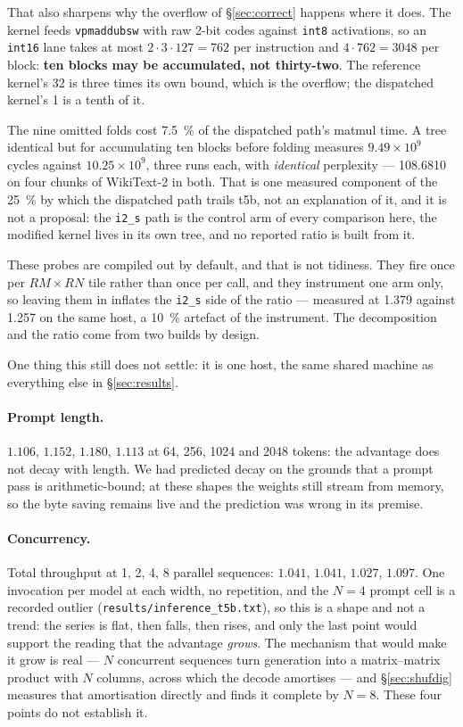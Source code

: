 \documentclass[11pt,a4paper]{article}
\newcommand{\code}[1]{\texttt{#1}}
\begin{document}
That also sharpens why the overflow of
\S\ref{sec:correct} happens where it does. The kernel feeds
\code{vpmaddubsw} with raw 2-bit codes against \code{int8} activations, so an
\code{int16} lane takes at most $2 \cdot 3 \cdot 127 = 762$ per instruction and
$4 \cdot 762 = 3048$ per block: \textbf{ten blocks may be accumulated, not
thirty-two}. The reference kernel's 32 is three times its own bound, which is
the overflow; the dispatched kernel's 1 is a tenth of it.

The nine omitted folds cost \SI{7.5}{\percent} of the dispatched path's
matmul time. A tree identical but for accumulating ten blocks before folding
measures $9.49 \times 10^{9}$ cycles against $10.25 \times 10^{9}$, three runs
each, with \emph{identical} perplexity --- \num{108.6810} on four chunks of
WikiText-2 in both. That is one measured component of the \SI{25}{\percent} by
which the dispatched path trails t5b, not an explanation of it, and it is not a
proposal: the \code{i2\_s} path is the control arm of every comparison here, the
modified kernel lives in its own tree, and no reported ratio is built from it.

These probes are compiled out by default, and that is not tidiness. They fire
once per $\mathit{RM} \times \mathit{RN}$ tile rather than once per call, and
they instrument one arm only, so leaving them in inflates the \code{i2\_s} side
of the ratio --- measured at \num{1.379} against \num{1.257} on the same host, a
\SI{10}{\percent} artefact of the instrument. The decomposition and the ratio
come from two builds by design.

One thing this still does not settle: it is one host, the same shared machine as
everything else in \S\ref{sec:results}.

\paragraph{Prompt length.} $1.106$, $1.152$, $1.180$, $1.113$ at 64, 256, 1024
and 2048 tokens: the advantage does not decay with length. We had predicted
decay on the grounds that a prompt pass is arithmetic-bound; at these shapes the
weights still stream from memory, so the byte saving remains live and the
prediction was wrong in its premise.

\paragraph{Concurrency.} Total throughput at 1, 2, 4, 8 parallel sequences:
$1.041$, $1.041$, $1.027$, $1.097$. One invocation per model at each width, no
repetition, and the $N=4$ prompt cell is a recorded outlier
(\code{results/inference\_t5b.txt}), so this is a shape and not a trend: the
series is flat, then falls, then rises, and only the last point would support
the reading that the advantage \emph{grows}. The mechanism that would make it
grow is real --- $N$ concurrent sequences turn generation into a
matrix--matrix product with $N$ columns, across which the decode amortises ---
and \S\ref{sec:shufdig} measures that amortisation directly and finds it
complete by $N=8$. These four points do not establish it.
\end{document}
